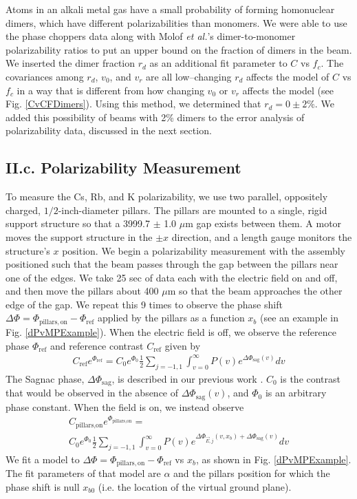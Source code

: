 \documentclass[twocolumn,prl,showpacs,superscriptaddress]{revtex4-1}   %
\newcommand{\figref}[1]{Fig. \ref{#1}}
\newcommand{\dphisag}{\Delta\Phi_{\mathrm{sag}}}
\newcommand{\etal}{\textit{et al.}}
\begin{document}
Atoms in an alkali metal gas have a small probability of forming homonuclear dimers, which have different polarizabilities than monomers. 
We were able to use the phase choppers data along with Molof \etal's dimer-to-monomer polarizability ratios \cite{Molof1974} to put an upper bound on the fraction of dimers in the beam. We inserted the dimer fraction $r_d$ as an additional fit parameter to $C$ vs $f_c$.
The covariances among $r_d$, $v_0$, and $v_r$ are all low--changing $r_d$ affects the model of $C$ vs $f_c$ in a way that is different from how changing $v_0$ or $v_r$ affects the model (see \figref{CvCFDimers}). 
Using this method, we determined that $r_d = 0 \pm 2\%$. We added this possibility of beams with 2\% dimers to the error analysis of polarizability data, discussed in the next section.


\subsection{II.c. Polarizability Measurement}

To measure the Cs, Rb, and K polarizability, we use two parallel, oppositely charged, $1/2$-inch-diameter pillars. The pillars are mounted to a single, rigid support structure so that a 3999.7 $\pm$ 1.0 $\mu$m gap exists between them. A motor moves the support structure in the $\pm x$ direction, and a length gauge monitors the structure's $x$ position. 
We begin a polarizability measurement with the assembly positioned such that the beam passes through the gap between the pillars near one of the edges.
We take 25 sec of data each with the electric field on and off, and then move the pillars about 400 $\mu$m so that the beam approaches the other edge of the gap. We repeat this 9 times to 
observe the phase shift $\Delta\Phi = \Phi_{\mathrm{pillars,on}} - \Phi_{\mathrm{ref}}$ applied by the pillars as a function $x_b$ (see an example in \figref{dPvMPExample}). 
When the electric field is off, we observe the reference phase $\Phi_{\mathrm{ref}}$ and reference contrast $C_{\mathrm{ref}}$ given by 
\begin{align}
	C_{\mathrm{ref}}e^{\Phi_{\mathrm{ref}}} = 
		C_0e^{\Phi_0} \frac{1}{2} \sum_{j=-1,1}
		\int_{v=0}^{\infty} P(v)
		e^{\dphisag(v)} 
		dv
	\label{CPPolesRef}
\end{align}
The Sagnac phase, $\dphisag$, is described in our previous work \cite{Holmgren2010}.
$C_0$ is the contrast that would be observed in the absence of $\dphisag(v)$, and $\Phi_0$ is an arbitrary phase constant.
When the field is on, we instead observe
\begin{align}
	C_{\textrm{pillars,on}}e^{\Phi_{\textrm{pillars,on}}} = 
		\nonumber \\
		C_0e^{\Phi_0}		
		\frac{1}{2} \sum_{j=-1,1}
		\int_{v=0}^{\infty} P(v)
		e^{
			\Delta\Phi_{\vec{E},j}(v,x_b) + 
			\dphisag(v)
		} 
		dv
	\label{CPPolesEOn}
\end{align}
We fit a model to $\Delta\Phi = \Phi_{\mathrm{pillars,on}} - \Phi_{\mathrm{ref}}$ vs $x_b$, as shown in \figref{dPvMPExample}. The fit parameters of that model are $\alpha$ and the pillars position for which the phase shift is null $x_{b0}$ (i.e. the location of the virtual ground plane). 
\end{document}

